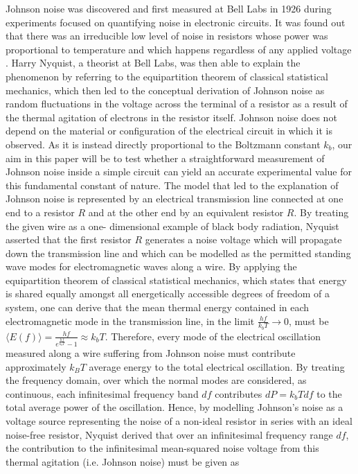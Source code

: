 \maketitle
\begin{linenumbers}
    

Johnson noise was discovered and first measured at Bell Labs in 1926 during experiments focused on quantifying noise in electronic circuits. It was found out that there was an irreducible low level of noise in resistors whose power was proportional to temperature and which happens regardless of any applied voltage  \cite{PhysRev.32.97}. Harry Nyquist, a theorist at Bell Labs, was then able to explain the phenomenon by referring to  the equipartition theorem of classical statistical mechanics, which then led to the conceptual derivation of Johnson noise as random fluctuations in the voltage across the terminal of a resistor as a result of the thermal agitation of electrons in the resistor itself. Johnson noise does not depend on the material or configuration of the electrical circuit in which it is observed. As it is instead directly proportional to the Boltzmann constant $k_b$, our aim in this paper will be to test whether a straightforward measurement of Johnson noise inside a simple circuit can yield an accurate experimental value for this fundamental constant of nature. 
The model that led to the explanation of Johnson noise is represented by an electrical transmission line connected at one end to a resistor $R$ and at the other end by an equivalent resistor $R$. By treating the given wire as a one- dimensional example of black body radiation, Nyquist asserted that the first resistor $R$ generates a noise voltage which will propagate down the transmission line and which can be modelled as the permitted standing wave modes for electromagnetic waves along a wire. By applying the equipartition theorem  of classical statistical mechanics, which states that energy is shared equally amongst all energetically accessible degrees of freedom of a system, one can derive that the mean thermal energy contained in each electromagnetic mode in the transmission line, in the limit $\frac{hf}{k_bT}\rightarrow 0$, must be $\langle E(f) \rangle= \frac{hf}{e^{\frac{hf}{k_bT}}-1} \approx k_bT$. Therefore, every mode of the electrical oscillation measured along a wire suffering from Johnson noise must contribute approximately $k_BT$ average energy to the total electrical oscillation\cite{PhysRev.32.110}. By treating the frequency domain, over which the normal modes are considered, as continuous, each infinitesimal frequency band $df$ contributes $dP = k_bTdf$ to the total average power of the oscillation. Hence, by modelling Johnson's noise as a voltage source representing the noise of a non-ideal resistor in series with an ideal noise-free resistor, Nyquist derived that over an infinitesimal frequency range $df$, the contribution to the infinitesimal mean-squared noise voltage from this thermal agitation (i.e. Johnson noise) must be given as

\end{linenumbers}
